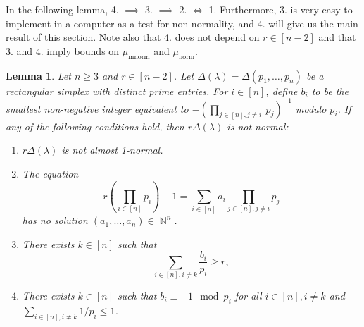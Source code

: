 \documentclass[a4paper,11pt]{amsart}
\theoremstyle{plain}
\newtheorem{lemma}[theorem]{Lemma}
\theoremstyle{definition}
\theoremstyle{remark}
\DeclareMathOperator{\NN}{\mathbb{N}}
\DeclareMathOperator{\mnorm}{mnorm}
\DeclareMathOperator{\norm}{norm}
\begin{document}
In the following lemma, 4. $\implies$ 3. $\implies$ 2. $\iff$ 1. Furthermore, 3. is very easy to implement in a computer as a test for non-normality, and 4. will give us the main result of this section. Note also that 4. does not depend on $r \in [n - 2]$ and that 3. and 4. imply bounds on $\mu_{\mnorm}$ and $\mu_{\norm}$.

\begin{lemma}\label{lemma:non-normal-dilations-criteria}
    Let $n \geq 3$ and $r \in [n - 2]$. Let $\Delta(\lambda) = \Delta(p_1, \ldots, p_n)$ be a rectangular simplex with distinct prime entries. For $i \in [n]$, define $b_i$ to be the smallest non-negative integer equivalent to $-(\prod_{j \in [n], j \neq i}~p_j)^{-1}$ modulo $p_i$. If any of the following conditions hold, then $r\Delta(\lambda)$ is not normal:
    \begin{enumerate}[1.]
        \item $r\Delta(\lambda)$ is not almost 1-normal.
        \item The equation
        \begin{equation}\label{eq:1}
            r\left ( \prod_{i \in [n]} p_i \right ) - 1 = \sum_{i \in [n]} a_i \prod_{j \in [n], j \neq i} p_j
        \end{equation}
        has no solution $(a_1, \ldots, a_n) \in \NN^n$.
        \item There exists $k \in [n]$ such that
        \[
        \sum_{i \in [n], i \neq k} \frac{b_i}{p_i} \geq r,
        \]
        \item There exists $k \in [n]$ such that $b_i \equiv -1 \mod p_i$ for all $i \in [n], i \neq k$ and $\sum_{i \in [n], i \neq k} 1/p_i \leq 1$.
    \end{enumerate}
\end{lemma}
\end{document}

